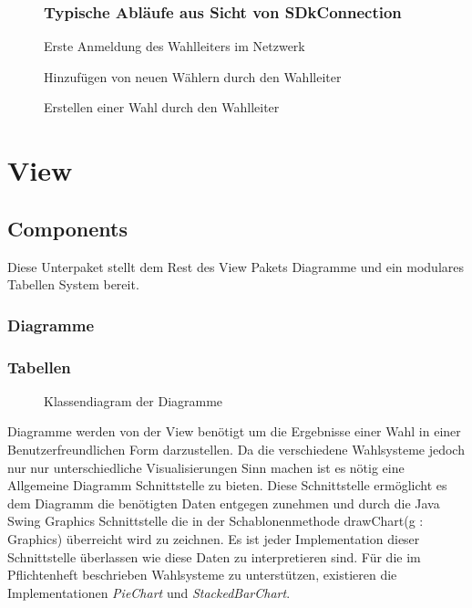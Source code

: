 \documentclass[parskip=full]{scrartcl}
\begin{document}
	\pagebreak
	\begin{sidewaysfigure}[!h]
		\subsubsection{Typische Abläufe aus Sicht von SDkConnection}
		\centering
		
		\caption{Erste Anmeldung des Wahlleiters im Netzwerk}
	\end{sidewaysfigure}
	\begin{sidewaysfigure}[!h]
		\centering
		
		\caption{Hinzufügen von neuen Wählern durch den Wahlleiter}
	\end{sidewaysfigure}
	\begin{sidewaysfigure}[!h]
		\centering
		
		\caption{Erstellen einer Wahl durch den Wahlleiter}
	\end{sidewaysfigure}
	\pagebreak	


	\section{View}
		\subsection{Components}
		Diese Unterpaket stellt dem Rest des View Pakets Diagramme und ein modulares Tabellen System bereit.
		
		\subsubsection{Diagramme}
		\subsubsection{Tabellen}
		\begin{figure}[!h]
			\centering
			
			\caption{Klassendiagram der Diagramme}
		\end{figure}
		
		Diagramme werden von der View benötigt um die Ergebnisse einer Wahl in einer Benutzerfreundlichen Form darzustellen. Da die verschiedene Wahlsysteme jedoch nur nur unterschiedliche Visualisierungen Sinn machen ist es nötig eine Allgemeine Diagramm Schnittstelle zu bieten. Diese Schnittstelle ermöglicht es dem Diagramm die benötigten Daten entgegen zunehmen und durch die Java Swing Graphics Schnittstelle die in der Schablonenmethode drawChart(g : Graphics) überreicht wird zu zeichnen. Es ist jeder Implementation dieser Schnittstelle überlassen wie diese Daten zu interpretieren sind. Für die im Pflichtenheft beschrieben Wahlsysteme zu unterstützen, existieren die Implementationen \textit{PieChart} und \textit{StackedBarChart}.
		
\end{document}
